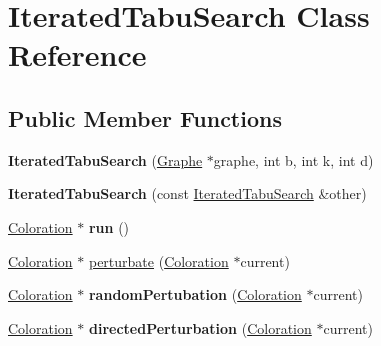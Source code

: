 \hypertarget{classIteratedTabuSearch}{\section{Iterated\-Tabu\-Search Class Reference}
\label{classIteratedTabuSearch}
}
\subsection*{Public Member Functions}
\begin{DoxyCompactItemize}
\item 
\hypertarget{classIteratedTabuSearch_aa6ee0209f341f8592830d1f40e934ff6}{{\bfseries Iterated\-Tabu\-Search} (\hyperlink{classGraphe}{Graphe} $\ast$graphe, int b, int k, int d)}\label{classIteratedTabuSearch_aa6ee0209f341f8592830d1f40e934ff6}

\item 
\hypertarget{classIteratedTabuSearch_adf8b9a7b53b2c696e435140ff2b030d1}{{\bfseries Iterated\-Tabu\-Search} (const \hyperlink{classIteratedTabuSearch}{Iterated\-Tabu\-Search} \&other)}\label{classIteratedTabuSearch_adf8b9a7b53b2c696e435140ff2b030d1}

\item 
\hypertarget{classIteratedTabuSearch_a4c1498ec384fee4efd53cabf6a26e8c2}{\hyperlink{classColoration}{Coloration} $\ast$ {\bfseries run} ()}\label{classIteratedTabuSearch_a4c1498ec384fee4efd53cabf6a26e8c2}

\item 
\hyperlink{classColoration}{Coloration} $\ast$ \hyperlink{classIteratedTabuSearch_a679b4a12ad1e23e6c46ca5a7915ce7ae}{perturbate} (\hyperlink{classColoration}{Coloration} $\ast$current)
\item 
\hypertarget{classIteratedTabuSearch_ab5d28558928680f1d3280ef1e882e95f}{\hyperlink{classColoration}{Coloration} $\ast$ {\bfseries random\-Pertubation} (\hyperlink{classColoration}{Coloration} $\ast$current)}\label{classIteratedTabuSearch_ab5d28558928680f1d3280ef1e882e95f}

\item 
\hypertarget{classIteratedTabuSearch_acc9456742f07dec6fae3e4cdf75adf64}{\hyperlink{classColoration}{Coloration} $\ast$ {\bfseries directed\-Perturbation} (\hyperlink{classColoration}{Coloration} $\ast$current)}\label{classIteratedTabuSearch_acc9456742f07dec6fae3e4cdf75adf64}

\end{DoxyCompactItemize}


